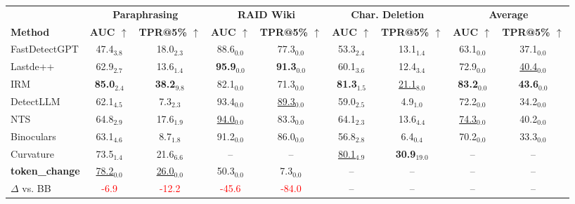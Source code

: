 \begin{tabular}{lcccccccc}
\toprule
 & \multicolumn{2}{c}{\textbf{Paraphrasing}} & \multicolumn{2}{c}{\textbf{RAID Wiki}} & \multicolumn{2}{c}{\textbf{Char. Deletion}} & \multicolumn{2}{c}{\textbf{Average}} \\
\cmidrule(lr){2-3} \cmidrule(lr){4-5} \cmidrule(lr){6-7} \cmidrule(lr){8-9}
\textbf{Method} & \textbf{AUC $\uparrow$} & \textbf{TPR@5\% $\uparrow$} & \textbf{AUC $\uparrow$} & \textbf{TPR@5\% $\uparrow$} & \textbf{AUC $\uparrow$} & \textbf{TPR@5\% $\uparrow$} & \textbf{AUC $\uparrow$} & \textbf{TPR@5\% $\uparrow$} \\
\midrule
FastDetectGPT & 47.4$_{3.8}$ & 18.0$_{2.3}$ & 88.6$_{0.0}$ & 77.3$_{0.0}$ & 53.3$_{2.4}$ & 13.1$_{1.4}$ & 63.1$_{0.0}$ & 37.1$_{0.0}$ \\
Lastde++ & 62.9$_{2.7}$ & 13.6$_{1.4}$ & \cellcolor{cyan!25}\textbf{95.9$_{0.0}$} & \cellcolor{cyan!25}\textbf{91.3$_{0.0}$} & 60.1$_{3.6}$ & 12.4$_{3.4}$ & 72.9$_{0.0}$ & \cellcolor{orange!25}\underline{40.4$_{0.0}$} \\
IRM & \cellcolor{cyan!25}\textbf{85.0$_{2.4}$} & \cellcolor{cyan!25}\textbf{38.2$_{9.8}$} & 82.1$_{0.0}$ & 71.3$_{0.0}$ & \cellcolor{cyan!25}\textbf{81.3$_{1.5}$} & \cellcolor{orange!25}\underline{21.1$_{8.0}$} & \cellcolor{cyan!25}\textbf{83.2$_{0.0}$} & \cellcolor{cyan!25}\textbf{43.6$_{0.0}$} \\
DetectLLM & 62.1$_{4.5}$ & 7.3$_{2.3}$ & 93.4$_{0.0}$ & \cellcolor{orange!25}\underline{89.3$_{0.0}$} & 59.0$_{2.5}$ & 4.9$_{1.0}$ & 72.2$_{0.0}$ & 34.2$_{0.0}$ \\
NTS & 64.8$_{2.9}$ & 17.6$_{1.9}$ & \cellcolor{orange!25}\underline{94.0$_{0.0}$} & 83.3$_{0.0}$ & 64.1$_{2.3}$ & 13.6$_{4.4}$ & \cellcolor{orange!25}\underline{74.3$_{0.0}$} & 40.2$_{0.0}$ \\
Binoculars & 63.1$_{4.6}$ & 8.7$_{1.8}$ & 91.2$_{0.0}$ & 86.0$_{0.0}$ & 56.8$_{2.8}$ & 6.4$_{0.4}$ & 70.2$_{0.0}$ & 33.3$_{0.0}$ \\
Curvature & 73.5$_{1.4}$ & 21.6$_{6.6}$ & -- & -- & \cellcolor{orange!25}\underline{80.1$_{4.9}$} & \cellcolor{cyan!25}\textbf{30.9$_{19.0}$} & -- & -- \\
\midrule
\textbf{token\_change} & \cellcolor{orange!25}\underline{78.2$_{0.0}$} & \cellcolor{orange!25}\underline{26.0$_{0.0}$} & 50.3$_{0.0}$ & 7.3$_{0.0}$ & -- & -- & -- & -- \\
$\Delta$ vs. BB & \textcolor{red}{-6.9} & \textcolor{red}{-12.2} & \textcolor{red}{-45.6} & \textcolor{red}{-84.0} & -- & -- & -- & -- \\
\bottomrule
\end{tabular}
